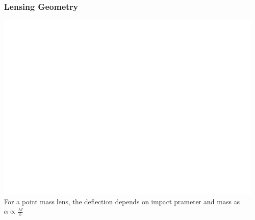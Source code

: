 \documentclass{beamer}
\begin{document}


\frame
{
    \frametitle{Lensing Geometry}

    \begin{center}
        \includegraphics[scale=0.4]{lens_geometry_invert.pdf}
        \newline
        For a point mass lens, the deflection depends on impact
        prameter and mass as
        \newline
        {\huge {\color{gold} $\alpha \propto \frac{M}{b}$ }}
    \end{center}
}
\end{document}
